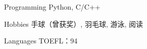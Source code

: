 

\vspace{-1.5mm}
\begin{cvskills}


\cvskill
{Programming} %
{Python, C/C++} %


\cvskill
{Hobbies} %
{手球（曾获奖）, 羽毛球, 游泳, 阅读} %


\cvskill
{Languages} %
{TOEFL：94} %

\end{cvskills}